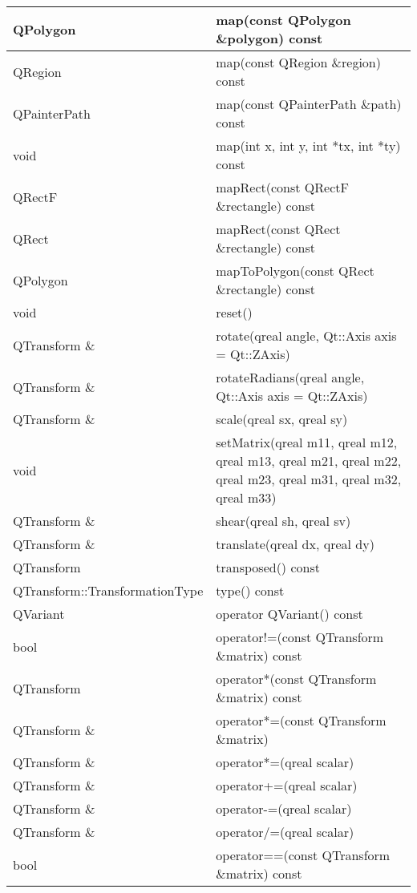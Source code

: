\begin{longtable}{|l|m{25em}|}
\hline
QPolygon &	map(const QPolygon \&polygon) const\\
\hline
QRegion &	map(const QRegion \&region) const\\
\hline
QPainterPath 	&map(const QPainterPath \&path) const\\
\hline
void 	&map(int x, int y, int *tx, int *ty) const\\
\hline
QRectF &	mapRect(const QRectF \&rectangle) const\\
\hline
QRect &	mapRect(const QRect \&rectangle) const\\
\hline
QPolygon 	&mapToPolygon(const QRect \&rectangle) const\\
\hline
void &	reset()\\
\hline
QTransform \& 	&rotate(qreal angle, Qt::Axis axis = Qt::ZAxis)\\
\hline
QTransform \& 	&rotateRadians(qreal angle, Qt::Axis axis = Qt::ZAxis)\\
\hline
QTransform \& 	&scale(qreal sx, qreal sy)\\
\hline
void 	&setMatrix(qreal m11, qreal m12, qreal m13, qreal m21, qreal m22, qreal m23, qreal m31, qreal m32, qreal m33)\\
\hline
QTransform \& &	shear(qreal sh, qreal sv)\\
\hline
QTransform \& &	translate(qreal dx, qreal dy)\\
\hline
QTransform &	transposed() const\\
\hline
QTransform::TransformationType &	type() const\\
\hline
QVariant &	operator QVariant() const\\
\hline
bool 	&operator!=(const QTransform \&matrix) const\\
\hline
QTransform &	operator*(const QTransform \&matrix) const\\
\hline
QTransform \& &	operator*=(const QTransform \&matrix)\\
\hline
QTransform \& &	operator*=(qreal scalar) \\
\hline
QTransform \& &	operator+=(qreal scalar)\\
\hline
QTransform \& &	operator-=(qreal scalar)\\
\hline
QTransform \& &	operator/=(qreal scalar) \\
\hline
bool &	operator==(const QTransform \&matrix) const \\
\hline
\end{longtable}



